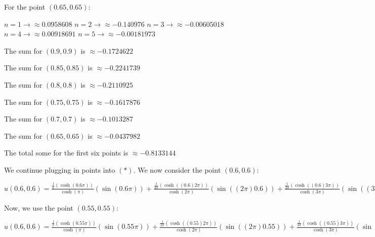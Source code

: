 \documentclass[executivepaper]{article}
\begin{document}
\begin{flushleft}
\vspace{2mm}

For the point $(0.65,0.65)$:

\vspace{1mm}

$n=1 \rightarrow \approx 0.0958608$
$n=2 \rightarrow \approx -0.140976$
$n=3 \rightarrow \approx -0.00605018$
$n=4 \rightarrow \approx 0.00918691$
$n=5 \rightarrow \approx -0.00181973$

\vspace{2mm}

The sum for $(0.9,0.9)$ is $\approx -0.1724622$

The sum for $(0.85,0.85)$ is $\approx -0.2241739$

The sum for $(0.8,0.8)$ is $\approx -0.2110925$

The sum for $(0.75,0.75)$ is $\approx -0.1617876$

The sum for $(0.7,0.7)$ is $\approx -0.1013287$

The sum for $(0.65,0.65)$ is $\approx -0.0437982$

The total some for the first six points is $\approx -0.8133144$

\vspace{2mm}

We continue plugging in points into $(*)$. We now consider the point $(0.6,0.6)$:

\begin{center}

$u(0.6,0.6)=\frac{\frac{1}{\pi} \left(\cosh\left(0.6\pi\right)\right)}{\cosh(\pi)} \left(\sin(0.6\pi)\right) + \frac{\frac{1}{2\pi} \left(\cosh\left((0.6)2\pi\right)\right)}{\cosh(2\pi)} \left(\sin((2\pi)0.6)\right) + \frac{\frac{1}{3\pi} \left(\cosh\left((0.6)3\pi\right)\right)}{\cosh(3\pi)} \left(\sin((3\pi)0.6)\right) + \frac{\frac{1}{4\pi} \left(\cosh\left((0.6)4\pi\right)\right)}{\cosh(4\pi)} \left(\sin((4\pi)0.6)\right) + \frac{\frac{1}{5\pi} \left(\cosh\left((0.6)5\pi\right)\right)}{\cosh(5\pi)} \left(\sin((5\pi)0.6)\right) \approx 0.0879821-0.0748284 - 0.0141906 + 0.0049011 + 0 \approx 0.00386421$

\end{center}

Now, we use the point $(0.55,0.55)$:

\begin{center}

$u(0.6,0.6)=\frac{\frac{1}{\pi} \left(\cosh\left(0.55\pi\right)\right)}{\cosh(\pi)} \left(\sin(0.55\pi)\right) + \frac{\frac{1}{2\pi} \left(\cosh\left((0.55)2\pi\right)\right)}{\cosh(2\pi)} \left(\sin((2\pi)0.55)\right) + \frac{\frac{1}{3\pi} \left(\cosh\left((0.55)3\pi\right)\right)}{\cosh(3\pi)} \left(\sin((3\pi)0.55)\right) + \frac{\frac{1}{4\pi} \left(\cosh\left((0.55)4\pi\right)\right)}{\cosh(4\pi)} \left(\sin((4\pi)0.55)\right) + \frac{\frac{1}{5\pi} \left(\cosh\left((0.55)5\pi\right)\right)}{\cosh(5\pi)} \left(\sin((5\pi)0.55)\right) \approx 0.777117-0.0287471 - 0.0134281 + 0.00161596 + 0.7369306 \approx 0.7369306$


\end{center}
\end{flushleft}
\end{document}
